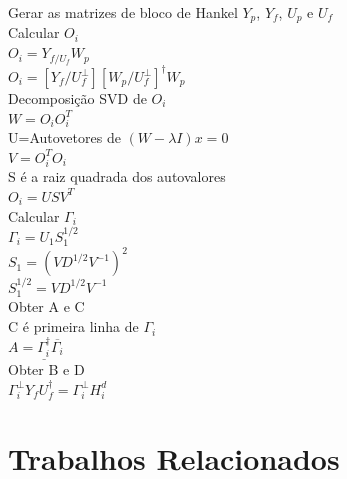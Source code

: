 \IncMargin{1em}
\begin{algorithm}[H]
	\nl Gerar as matrizes de bloco de Hankel $Y_p$, $Y_f$, $U_p$ e $U_f$\\
	\nl Calcular $O_i$ \\
	$O_i=Y_{f/U_f} W_p$\\
	$O_i=[Y_f/U_f^\perp][W_p/U_f^\perp]^\dagger W_p$\\
	\nl Decomposição SVD de $O_i$ \\
	$W=O_i  O_i^T$\\
	U=Autovetores de $(W-\lambda I)x=0$\\
	$V=O_i^T O_i$\\
	S é a raiz quadrada dos autovalores\\
	$O_i=USV^T$\\
	\nl Calcular $\Gamma_i$\\
	$\Gamma_i=U_1 S_1 ^{1/2}$\\
	$S_1=(VD^{1/2}V^{-1})^2$\\
	$S_1^{1/2}=VD^{1/2}V^{-1}$\\
	\nl Obter A e C \\
	C é  primeira linha de $\Gamma_i$\\
	$A=\underline{\Gamma_i^\dagger}\overline{\Gamma_i}$\\
	\nl Obter B e D\\
	$\Gamma_i ^\perp Y_f U_f ^\dagger=\Gamma_i ^\perp H^d_i$
	
	
\end{algorithm}
\DecMargin{1em}

\section{Trabalhos Relacionados}


















